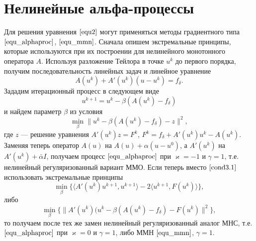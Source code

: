 \section{Нелинейные альфа-процессы}
Для решения уравнения $\eqref{equ2}$ могут применяться методы градиентного типа $\eqref{equ_alphaproc}$, $\eqref{equ_mmn}$.
Сначала опишем экстремальные принципы, которые используются при их  построении для нелинейного монотонного оператора $A$. Используя разложение Тейлора в точке $u^k$ до первого порядка, получим последовательность линейных задач и линейное уравнение
\begin{equation*}
A(u^k)+A'(u^k)(u-u^k)=f_{\delta}.
\end{equation*}
Зададим итерационный процесс в следующем виде
\begin{equation*}
u^{k+1}=u^k-\beta(A(u^k)-f_{\delta})
\end{equation*}
и найдем параметр $\beta$ из условия
\begin{equation}\label{cond3.1}
\min_{\beta}{\|u^k-\beta(A(u^k)-f_{\delta})-z\|^2},
\end{equation}
где $z$ --- решение уравнения $A'(u^k)z=F^k$, $F^k=f_{\delta}+A'(u^k)u^k-A(u^k)$. Заменяя теперь оператор $A(u)$ на $A(u)+\alpha(u-u^0)$, а $A'(u^k)$ на $A'(u^k)+\bar\alpha I$, получаем процесс $\eqref{equ_alphaproc}$ при $\varkappa=-1$ и $\gamma=1$, т.е. нелинейный регуляризованный вариант ММО. Если теперь вместо $\eqref{cond3.1}$ использовать экстремальные принципы
$$\min_{\beta}\{\langle A'(u^k)u^{k+1},u^{k+1}\rangle-2\langle u^{k+1},F(u^k)\rangle\},$$
либо 
\begin{equation}\label{cond3.2}
\min_{\beta}\{\|A'(u^k)(u^k-\beta(A(u^k)-f_{\delta})-F(u^k)\|^2\},
\end{equation}
то получаем после тех же замен нелинейный регуляризованный аналог МНС, т.е. $\eqref{equ_alphaproc}$ при $\varkappa=0$ и $\gamma=1$, либо ММН $\eqref{equ_mmn}$, $\gamma=1$.


